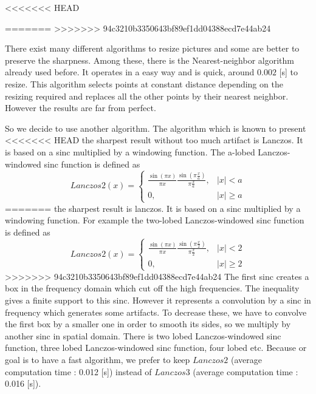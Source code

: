 <<<<<<< HEAD
 
=======
>>>>>>> 94c3210b3350643bf89ef1dd04388ecd7e44ab24

There exist many different algorithms to resize pictures and some are better to preserve the sharpness. Among these, there is the Nearest-neighbor algorithm already used before. It operates in a easy way and is quick, around $0.002$ [s] to resize.  This algorithm selects points at constant distance depending on the resizing required and replaces all the other points by their nearest neighbor. %
 However the results are far from perfect.

So we decide to use another algorithm. The algorithm which is known to present %
<<<<<<< HEAD
the sharpest result without too much artifact is Lanczos. It is based on a sinc multiplied by a windowing function. The a-lobed Lanczos-windowed sinc function is defined as 
\[
Lanczos2(x) = 
\left\{  \begin{array}{cc}
\frac{\sin(\pi x )}{\pi x} \frac{\sin (\pi \frac{x}{a}) }{\pi \frac{x}{a}}, & |x| < a\\
0, & |x| \geq a
\end{array} \right. \]
=======
the sharpest result is lanczos. It is based on a sinc multiplied by a windowing function. For example the two-lobed Lanczos-windowed sinc function is defined as
\begin{equation*}
Lanczos2(x) =
\begin{cases}
\frac{\sin(\pi x )}{\pi x} \frac{\sin (\pi \frac{x}{2}) }{\pi \frac{x}{2}}, & |x| < 2\\
0, & |x| \geq 2
\end{cases}
\end{equation*}
>>>>>>> 94c3210b3350643bf89ef1dd04388ecd7e44ab24
The first sinc creates a box in the frequency domain which cut off the high frequencies. The inequality gives a finite support to this sinc. However it represents a convolution by a sinc in frequency which generates some artifacts. To decrease these, we have to convolve the first box by a smaller one in order to smooth its sides, so we multiply by another sinc in spatial domain. 
There is two lobed Lanczos-windowed sinc function, three lobed Lanczos-windowed sinc function, four lobed etc. Because or goal is to have a fast algorithm, we prefer to keep $Lanczos2$ (average computation time :  0.012 [s]) instead of $Lanczos3$ (average computation time : 0.016 [s]). 



